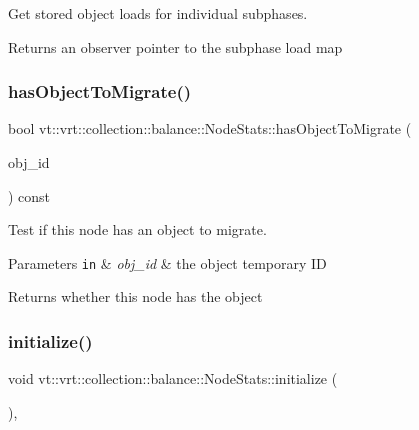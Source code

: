 Get stored object loads for individual subphases. 

\begin{DoxyReturn}{Returns}
an observer pointer to the subphase load map 
\end{DoxyReturn}
\mbox{\label{structvt_1_1vrt_1_1collection_1_1balance_1_1_node_stats_a06128ad9d9dff72bad160b015054b054}} 
\subsubsection{\texorpdfstring{has\+Object\+To\+Migrate()}{hasObjectToMigrate()}}
{\footnotesize\ttfamily bool vt\+::vrt\+::collection\+::balance\+::\+Node\+Stats\+::has\+Object\+To\+Migrate (\begin{DoxyParamCaption}\item[{\hyperlink{namespacevt_1_1vrt_1_1collection_1_1balance_a14c8d2c972f2913aa3f1636e5be0a120}{Element\+I\+D\+Type}}]{obj\+\_\+id }\end{DoxyParamCaption}) const}



Test if this node has an object to migrate. 


\begin{DoxyParams}[1]{Parameters}
\mbox{\tt in}  & {\em obj\+\_\+id} & the object temporary ID\\
\hline
\end{DoxyParams}
\begin{DoxyReturn}{Returns}
whether this node has the object 
\end{DoxyReturn}
\mbox{\label{structvt_1_1vrt_1_1collection_1_1balance_1_1_node_stats_a0c60d1566daa6465f56b09e27058d6a1}} 
\subsubsection{\texorpdfstring{initialize()}{initialize()}}
{\footnotesize\ttfamily void vt\+::vrt\+::collection\+::balance\+::\+Node\+Stats\+::initialize (\begin{DoxyParamCaption}{ }\end{DoxyParamCaption})\hspace{0.3cm}{\ttfamily [override]}, {\ttfamily [virtual]}}



